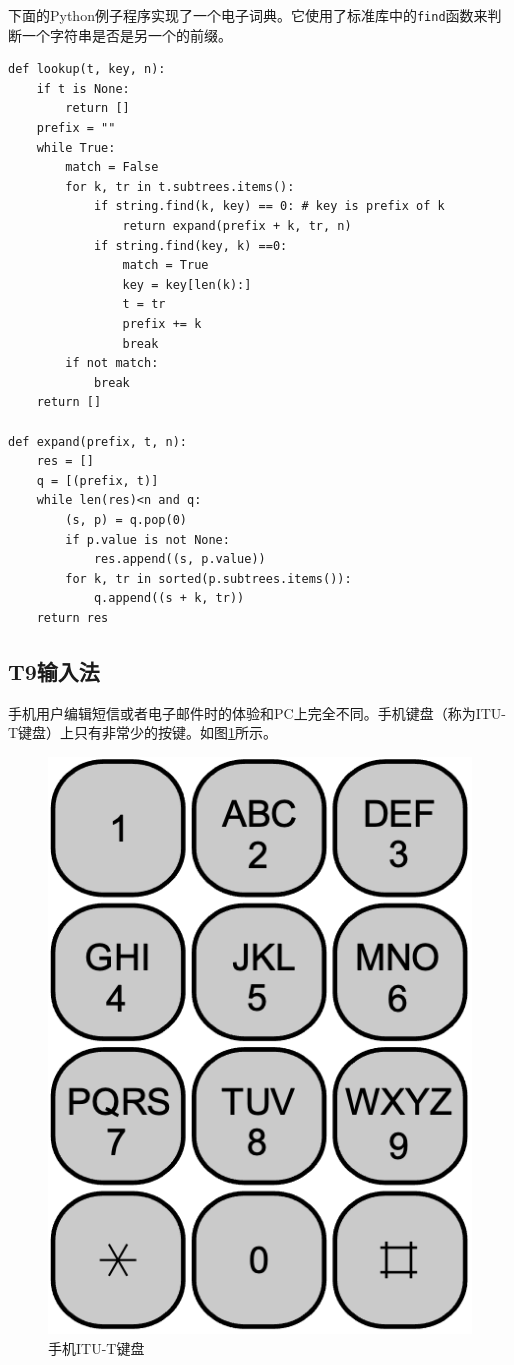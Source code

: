 \documentclass[b5paper]{ctexart}
\begin{document}
下面的Python例子程序实现了一个电子词典。它使用了标准库中的\texttt{find}函数来判断一个字符串是否是另一个的前缀。

\lstset{language=Python}
\begin{lstlisting}
def lookup(t, key, n):
    if t is None:
        return []
    prefix = ""
    while True:
        match = False
        for k, tr in t.subtrees.items():
            if string.find(k, key) == 0: # key is prefix of k
                return expand(prefix + k, tr, n)
            if string.find(key, k) ==0:
                match = True
                key = key[len(k):]
                t = tr
                prefix += k
                break
        if not match:
            break
    return []

def expand(prefix, t, n):
    res = []
    q = [(prefix, t)]
    while len(res)<n and q:
        (s, p) = q.pop(0)
        if p.value is not None:
            res.append((s, p.value))
        for k, tr in sorted(p.subtrees.items()):
            q.append((s + k, tr))
    return res
\end{lstlisting}


\subsection{T9输入法}

手机用户编辑短信或者电子邮件时的体验和PC上完全不同。手机键盘（称为ITU-T键盘）上只有非常少的按键。如图\ref{fig:itut-keypad}所示。

\begin{figure}[htbp]
  \centering
  \includegraphics[scale=0.4]{img/itu-t.png}
  \caption{手机ITU-T键盘}
  \label{fig:itut-keypad}
\end{figure}
\end{document}
